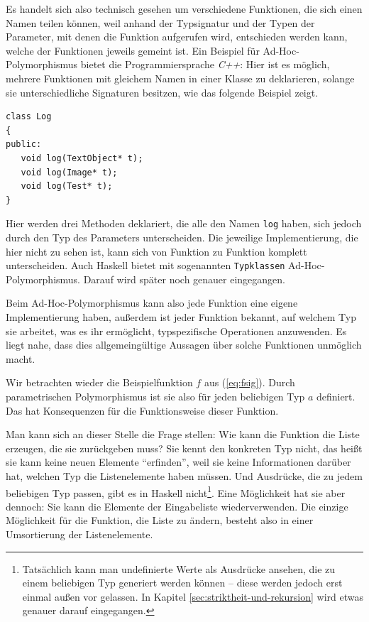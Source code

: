 Es handelt sich also technisch gesehen um verschiedene Funktionen, die sich einen Namen teilen können, weil anhand der Typsignatur
und der Typen der Parameter, mit denen die Funktion aufgerufen wird, entschieden werden kann, welche der Funktionen jeweils gemeint ist.
Ein Beispiel für Ad-Hoc-Polymorphismus bietet die Programmiersprache \textit{C++}: Hier ist es möglich, mehrere Funktionen mit gleichem
Namen in einer Klasse zu deklarieren, solange sie unterschiedliche Signaturen besitzen, wie das folgende Beispiel zeigt.

\begin{verbatim}
class Log
{
public:
   void log(TextObject* t);
   void log(Image* t);
   void log(Test* t);
}
\end{verbatim}

Hier werden drei Methoden deklariert, die alle den Namen \texttt{log} haben, sich jedoch durch den Typ des Parameters
unterscheiden. Die jeweilige Implementierung, die hier nicht zu sehen ist, kann sich von Funktion zu Funktion komplett unterscheiden.
Auch Haskell bietet mit sogenannten \texttt{Typklassen} Ad-Hoc-Polymorphismus. Darauf wird später noch genauer eingegangen.

Beim Ad-Hoc-Polymorphismus kann also jede Funktion eine eigene Implementierung haben, außerdem ist jeder Funktion
bekannt, auf welchem Typ sie arbeitet, was es ihr ermöglicht, typspezifische Operationen anzuwenden. Es liegt nahe, dass dies
allgemeingültige Aussagen über solche Funktionen unmöglich macht.


Wir betrachten wieder die Beispielfunktion $f$ aus (\ref{eq:fsig}). Durch parametrischen Polymorphismus ist sie also für jeden beliebigen
Typ $a$ definiert. Das hat Konsequenzen für die Funktionsweise dieser Funktion.

Man kann sich an dieser Stelle die Frage stellen: Wie kann die Funktion die Liste erzeugen, die sie zurückgeben muss? Sie kennt den konkreten Typ nicht,
das heißt sie kann keine neuen Elemente ``erfinden'', weil sie keine Informationen darüber hat, welchen Typ die Listenelemente haben müssen.
Und Ausdrücke, die zu jedem beliebigen Typ passen, gibt es in Haskell
nicht\footnote{Tatsächlich kann man undefinierte Werte als Ausdrücke ansehen, die zu einem beliebigen Typ generiert werden können --
diese werden jedoch erst einmal außen vor gelassen. In Kapitel \ref{sec:striktheit-und-rekursion} wird etwas genauer darauf eingegangen.}.
Eine Möglichkeit hat sie aber dennoch: Sie kann die Elemente der Eingabeliste wiederverwenden.
Die einzige Möglichkeit für die Funktion, die Liste zu ändern, besteht also in einer Umsortierung der Listenelemente.

